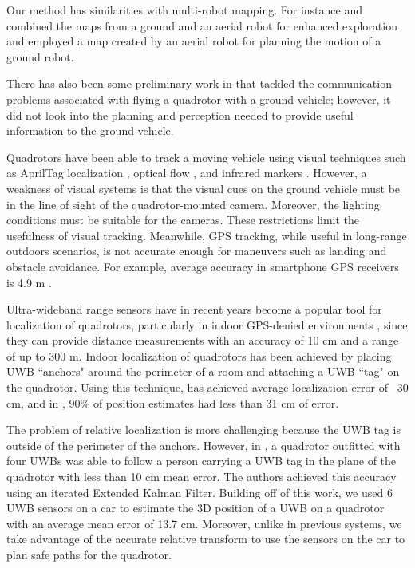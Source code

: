 Our method has similarities with multi-robot mapping. For instance \cite{Michael:2012gl} and \cite{Forster:2013kn} combined the maps from a ground and an aerial robot for enhanced exploration and \cite{Delmerico:2017vq} employed a map created by an aerial robot for planning the motion of a ground robot.

There has also been some preliminary work in \cite{nasser2015fleye} that tackled the communication problems associated with flying a quadrotor with a ground vehicle; however, it did not look into the planning and perception needed to provide useful information to the ground vehicle.



Quadrotors have been able to track a moving vehicle using visual techniques
such as AprilTag localization \cite{borowczyk2016autonomous}, optical flow \cite{herisse2012landing},
and infrared markers \cite{wenzel2011automatic}. However, a weakness of visual systems
is that the visual cues on the ground vehicle must be in the line
of sight of the quadrotor-mounted camera. Moreover, the lighting conditions must be suitable
for the cameras. These restrictions limit the usefulness of visual tracking. Meanwhile,
GPS tracking, while useful in long-range outdoors scenarios, is not accurate enough for 
maneuvers such as landing and obstacle avoidance. For example, average accuracy in
smartphone GPS receivers is 4.9 m \cite{gpsaccuracy}.

Ultra-wideband range sensors have in recent years become a popular tool for
localization of quadrotors, particularly in indoor GPS-denied environments 
\cite{liu2007survey, prorok2014, hollinger2012target, jourdan2005monte}, since they can
provide distance measurements with an accuracy of 10 cm and a range of
up to 300 m\cite{Decawave_Website}. Indoor localization of quadrotors has been
achieved by placing UWB ``anchors" around the perimeter of a room and attaching
a UWB ``tag" on the quadrotor.  Using this technique, \cite{mueller2015fusing}
has achieved average localization error of ~30 cm, and in
\cite{kempke2016harmonium}, 90\% of position estimates had less than 31 cm of error.

The problem of relative localization is more challenging because the UWB tag is outside of
the perimeter of the anchors. However, in \cite{tobiuwb}, a quadrotor
outfitted with four UWBs was able to follow a person carrying a UWB tag
in the plane of the quadrotor
with less than 10 cm mean error. The authors achieved this accuracy using an
iterated Extended Kalman Filter. Building off of this work, we used
6 UWB sensors on a car to estimate the 3D position of a UWB on a quadrotor with an
average mean error of 13.7 cm. Moreover, unlike in previous systems,
we take advantage of the accurate relative transform to use the sensors
on the car to plan safe paths for the quadrotor.


